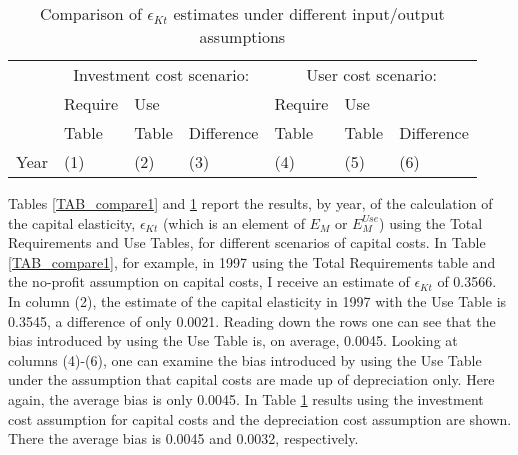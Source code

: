 \begin{table}[!htb]
\begin{center}
\caption{Comparison of $\epsilon_{Kt}$ estimates under different input/output assumptions}
\label{TAB_compare2}
{\footnotesize
\begin{tabularx}{\textwidth}{XXXXXXX}
\midrule
        & \multicolumn{3}{c}{Investment cost scenario:} & \multicolumn{3}{c}{User cost scenario:} \\ \cmidrule(lr){2-4} \cmidrule(lr){5-7} 
 & Require & Use   &            & Require&  Use  & \\
 & Table  & Table  & Difference & Table  &  Table & Difference \\
Year & (1) & (2) & (3) & (4) & (5) & (6) \\
\midrule

\midrule
\end{tabularx}
}
\end{center}
\vspace{-.5cm}
\end{table}

Tables \ref{TAB_compare1} and \ref{TAB_compare2} report the results, by year, of the calculation of the capital elasticity, $\epsilon_{Kt}$ (which is an element of $E_M$ or $E_M^{Use}$) using the Total Requirements and Use Tables, for different scenarios of capital costs. In Table \ref{TAB_compare1}, for example, in 1997 using the Total Requirements table and the no-profit assumption on capital costs, I receive an estimate of $\epsilon_{Kt}$ of 0.3566. In column (2), the estimate of the capital elasticity in 1997 with the Use Table is 0.3545, a difference of only 0.0021. Reading down the rows one can see that the bias introduced by using the Use Table is, on average, 0.0045. Looking at columns (4)-(6), one can examine the bias introduced by using the Use Table under the assumption that capital costs are made up of depreciation only. Here again, the average bias is only 0.0045. In Table \ref{TAB_compare2} results using the investment cost assumption for capital costs and the depreciation cost assumption are shown. There the average bias is 0.0045 and 0.0032, respectively. 

